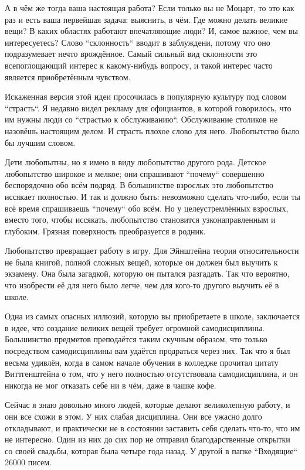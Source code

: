 \documentclass[ebook,12pt,oneside,openany]{memoir}
\begin{document}
А в чём же тогда ваша настоящая работа? Если только вы не Моцарт, то
это как раз и есть ваша первейшая задача: выяснить, в чём. Где можно
делать великие вещи? В каких областях работают впечатляющие люди? И,
самое важное, чем вы интересуетесь? Слово ``склонность`` вводит в
заблуждени, потому что оно подразумевает нечто врождённое. Самый
сильный вид склонности это всепоглощающий интерес к какому-нибудь
вопросу, и такой интерес часто является приобретённым чувством. \newline

Искаженная версия этой идеи просочилась в популярную культуру под
словом ``страсть``. Я недавно видел рекламу для официантов, в которой
говорилось, что им нужны люди со ``страстью к обслуживанию``.
Обслуживание столиков не назовёшь настоящим делом. И страсть плохое
слово для него. Любопытство было бы лучшим словом. \newline

Дети любопытны, но я имею в виду любопытство другого рода. Детское
любопытство широкое и мелкое; они спрашивают ``почему`` совершенно
беспорядочно обо всём подряд. В большинстве взрослых это любопытство
иссякает полностью. И так и должно быть: невозможно сделать что-либо,
если ты всё время спрашиваешь ``почему`` обо всём. Но у целеустремлённых
взрослых, вместо того, чтобы иссякать, любопытство становится
узконаправленным и глубоким. Грязная поверхность преобразуется в
родник. \newline

Любопытство превращает работу в игру. Для Эйнштейна теория
относительности не была книгой, полной сложных вещей, которые он
должен был выучить к экзамену. Она была загадкой, которую он пытался
разгадать. Так что вероятно, что изобрести её для него было легче, чем
для кого-то другого выучить её в школе. \newline

Одна из самых опасных иллюзий, которую вы приобретаете в школе,
заключается в идее, что создание великих вещей требует огромной
самодисциплины. Большинство предметов преподаётся таким скучным
образом, что только посредством самодисциплины вам удаётся продраться
через них. Так что я был весьма удивлён, когда в самом начале обучения
в колледже прочитал цитату Виттгенштейна о том, что у него полностью
отсутствовала самодисциплина, и он никогда не мог отказать себе ни в
чём, даже в чашке кофе. \newline

Сейчас я знаю довольно много людей, которые делают великолепную
работу, и они все схожи в этом. У них слабая дисциплина. Они все
ужасно долго откладывают, и практически не в состоянии заставить себя
сделать что-то, что им не интересно. Один из них до сих пор не
отправил благодарственные открытки со своей свадьбы, которая была
четыре года назад. У другой в папке ``Входящие`` 26000 писем. \newline
\end{document}
